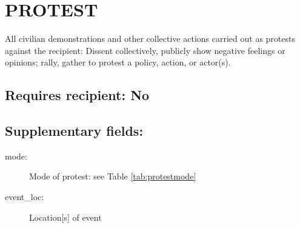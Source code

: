 \documentclass[11pt]{report}
\begin{document}
\newpage

\section{PROTEST}

All civilian demonstrations and other collective actions carried out as protests against the recipient: Dissent collectively, publicly show negative feelings or opinions; rally, gather to protest a policy, action, or actor(s).

\subsection{Requires recipient: No}

\subsection{Supplementary fields:}

\begin{description}
	\item[mode:] Mode of protest: see Table \ref{tab:protestmode}
	\item[event\_loc:] Location[s] of event
\end{description}

\end{document}
